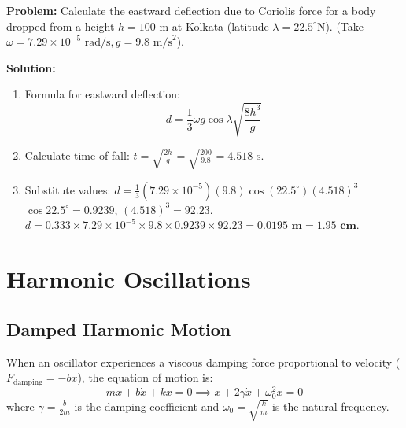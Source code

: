 \documentclass[12pt,a4paper]{article}
\begin{document}
\begin{tcolorbox}[examplebox, title={\textbf{Solved Problem 4: Eastward Deflection Calculation}}]
\textbf{Problem:} Calculate the eastward deflection due to Coriolis force for a body dropped from a height $h = 100\text{ m}$ at Kolkata (latitude $\lambda = 22.5^\circ\text{N}$). (Take $\omega = 7.29 \times 10^{-5}\text{ rad/s}, g = 9.8\text{ m/s}^2$).

\textbf{Solution:}\par\noindent
\begin{enumerate}[leftmargin=*, itemsep=2pt]
  \item Formula for eastward deflection:
   \begin{equation}
   d = \frac{1}{3} \omega g \cos\lambda \sqrt{\frac{8 h^3}{g}}
   \end{equation}
  \item Calculate time of fall: $t = \sqrt{\frac{2h}{g}} = \sqrt{\frac{200}{9.8}} = 4.518\text{ s}$.
  \item Substitute values:
   $d = \frac{1}{3} (7.29 \times 10^{-5}) (9.8) \cos(22.5^\circ) (4.518)^3$
   $\cos 22.5^\circ = 0.9239$, \quad $(4.518)^3 = 92.23$.
   $d = 0.333 \times 7.29 \times 10^{-5} \times 9.8 \times 0.9239 \times 92.23 = \mathbf{0.0195\text{ m} = 1.95\text{ cm}}$.
\end{enumerate}
\end{tcolorbox}

\section{Harmonic Oscillations}

\subsection{Damped Harmonic Motion}

When an oscillator experiences a viscous damping force proportional to velocity ($F_{\text{damping}} = -b \dot{x}$), the equation of motion is:
\begin{equation}
m \ddot{x} + b \dot{x} + k x = 0 \implies \ddot{x} + 2\gamma \dot{x} + \omega_0^2 x = 0
\end{equation}
where $\gamma = \frac{b}{2m}$ is the damping coefficient and $\omega_0 = \sqrt{\frac{k}{m}}$ is the natural frequency.
\end{document}
